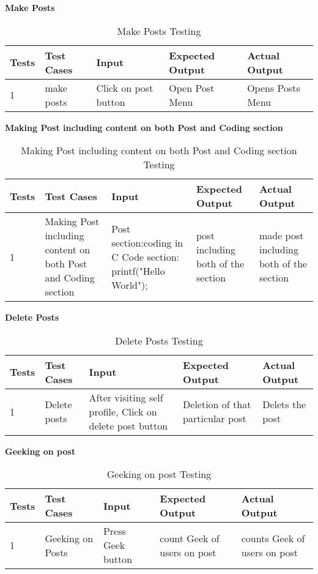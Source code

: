 \textbf{Make Posts}\\
\begin{table}[H]
    \caption{Make Posts Testing}
        \label{}
    \begin{tabular}{|p{0.3in}|p{1.3in}|p{1.3in}|p{1.3in}|p{1in}|}
        \hline
        Tests & Test Cases & Input &Expected Output & Actual Output \\
        \hline
            1 & make posts& Click on post button& Open Post Menu& Opens Posts Menu \\
            \hline
\end{tabular}
\end{table}

\textbf{Making Post including content on both Post and Coding section}\\
\begin{table}[H]
    \caption{Making Post including content on both Post and Coding section Testing}
        \label{}
    \begin{tabular}{|p{0.3in}|p{1.3in}|p{1.3in}|p{1.3in}|p{1in}|}
        \hline
        Tests & Test Cases & Input &Expected Output & Actual Output \\
        \hline
            1 & Making Post including content on both Post and Coding section& Post section:coding in C Code section: printf("Hello World");& post including both of the section& made post including both of the section\\
            \hline
\end{tabular}
\end{table}

\textbf{Delete Posts}\\
\begin{table}[H]
    \caption{Delete Posts Testing}
        \label{}
    \begin{tabular}{|p{0.3in}|p{1.3in}|p{1.3in}|p{1.3in}|p{1in}|}
        \hline
        Tests & Test Cases & Input &Expected Output & Actual Output \\
        \hline
            1 & Delete posts&After visiting self profile, Click on delete post button& Deletion of that particular post& Delets the post \\
            \hline
\end{tabular}
\end{table}

\textbf{Geeking on post}\\
\begin{table}[H]
    \caption{Geeking on post Testing}
        \label{}
    \begin{tabular}{|p{0.3in}|p{1.3in}|p{1.3in}|p{1.3in}|p{1in}|}
        \hline
        Tests & Test Cases & Input &Expected Output & Actual Output \\
        \hline
            1 & Geeking on Posts & Press Geek button& count Geek of users on post & counts Geek of users on post \\
            \hline
\end{tabular}
\end{table}

